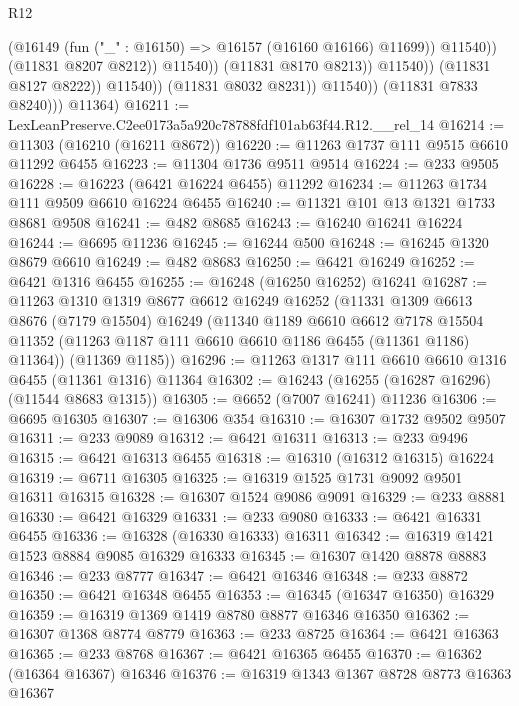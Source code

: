 \begin{lexlean}{R12}
\begin{coremodule}
                                      (@16149 (fun ("_" : @16150) => @16157 (@16160 @16166) @11699))
                                      @11540))
                                  (@11831 @8207 @8212))
                                @11540))
                            (@11831 @8170 @8213))
                          @11540))
                      (@11831 @8127 @8222))
                    @11540))
                (@11831 @8032 @8231))
              @11540))
          (@11831 @7833 @8240)))
      @11364)
@16211 := LexLeanPreserve.C2ee0173a5a920c78788fdf101ab63f44.R12.__rel_14
@16214 := @11303 (@16210 (@16211 @8672))
@16220 := @11263 @1737 @111 @9515 @6610 @11292 @6455
@16223 := @11304 @1736 @9511 @9514
@16224 := @233 @9505
@16228 := @16223 (@6421 @16224 @6455) @11292
@16234 := @11263 @1734 @111 @9509 @6610 @16224 @6455
@16240 := @11321 @101 @13 @1321 @1733 @8681 @9508
@16241 := @482 @8685
@16243 := @16240 @16241 @16224
@16244 := @6695 @11236
@16245 := @16244 @500
@16248 := @16245 @1320 @8679 @6610
@16249 := @482 @8683
@16250 := @6421 @16249
@16252 := @6421 @1316 @6455
@16255 := @16248 (@16250 @16252) @16241
@16287 := @11263
    @1310
    @1319
    @8677
    @6612
    @16249
    @16252
    (@11331
      @1309
      @6613
      @8676
      (@7179 @15504)
      @16249
      (@11340
        @1189
        @6610
        @6612
        @7178
        @15504
        @11352
        (@11263 @1187 @111 @6610 @6610 @1186 @6455 (@11361 @1186) @11364))
      (@11369 @1185))
@16296 := @11263 @1317 @111 @6610 @6610 @1316 @6455 (@11361 @1316) @11364
@16302 := @16243 (@16255 (@16287 @16296) (@11544 @8683 @1315))
@16305 := @6652 (@7007 @16241) @11236
@16306 := @6695 @16305
@16307 := @16306 @354
@16310 := @16307 @1732 @9502 @9507
@16311 := @233 @9089
@16312 := @6421 @16311
@16313 := @233 @9496
@16315 := @6421 @16313 @6455
@16318 := @16310 (@16312 @16315) @16224
@16319 := @6711 @16305
@16325 := @16319 @1525 @1731 @9092 @9501 @16311 @16315
@16328 := @16307 @1524 @9086 @9091
@16329 := @233 @8881
@16330 := @6421 @16329
@16331 := @233 @9080
@16333 := @6421 @16331 @6455
@16336 := @16328 (@16330 @16333) @16311
@16342 := @16319 @1421 @1523 @8884 @9085 @16329 @16333
@16345 := @16307 @1420 @8878 @8883
@16346 := @233 @8777
@16347 := @6421 @16346
@16348 := @233 @8872
@16350 := @6421 @16348 @6455
@16353 := @16345 (@16347 @16350) @16329
@16359 := @16319 @1369 @1419 @8780 @8877 @16346 @16350
@16362 := @16307 @1368 @8774 @8779
@16363 := @233 @8725
@16364 := @6421 @16363
@16365 := @233 @8768
@16367 := @6421 @16365 @6455
@16370 := @16362 (@16364 @16367) @16346
@16376 := @16319 @1343 @1367 @8728 @8773 @16363 @16367

\end{coremodule}
\end{lexlean}
